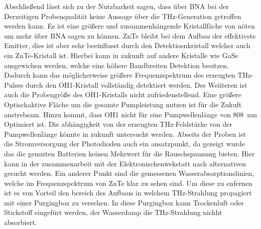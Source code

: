 Abschließend lässt sich zu der Nutzbarkeit sagen, dass über BNA bei der Derzeitigen Probenqualität keine Aussage über die THz-Generation 
getroffen werden kann. 
Es ist eine größere und zusammenhängende Kristallfäche von nöten um mehr über BNA sagen zu können. 
ZnTe bleibt bei dem Aufbau der effektivste Emitter, dies ist aber sehr beeinflusst durch den Detektiosnkristall welcher auch ein ZnTe-Kristall ist. 
Hierbei kann in zukunft auf andere Kristalle wie GaSe ausgewichen werden, welche eine höhere Bandbreiten Detektion besitzen. 
Dadurch kann das möglicherweise größere Frequenzspektrum des erzeugten THz-Pulses durch den OH1-Kristall vollständig detektiert werden. 
Des Weiiteren ist auch die Probengröße des OH1-Kristalls nicht zufriedenstellend. 
Eine größere Optischaktive Fläche um die gesamte Pumpleistung nutzen ist für die Zukuft anstrebsam. 
Hinzu kommt, dass OH1 nicht für eine Pumpwellenlänge von \SI{808}{nm} Optimiert ist. 
Die abhängigkeit von der erzeugten THz-Feldstärke von der Pumpwellenlänge könnte in zukunft untersucht werden. 
Abseits der Proben ist die Stromversorgung der Photodioden auch ein ansatzpunkt, da gezeigt wurde das die genuzten Batterien keinen Mehrwert für 
die Rauschspannung bieten. 
Hier kann in der zusammenarbeit mit der Elektronischenwekstatt nach alternativen gesucht werden. 
Ein anderer Punkt sind die gemessenen Wasserabsorptionslinien, welche im Frequenzspektrum von ZnTe klar zu sehen sind.
Um diese zu enfernen ist es von Vorteil den bereich des Aufbaus in welchem THz-Strahlung propagiert mit einer Purgingbox zu versehen. 
In diese Purgingbox kann Trockenluft oder Stickstoff eingefürt werden, 
der Wasserdamp die THz-Strahlung nichht absorbiert. 
